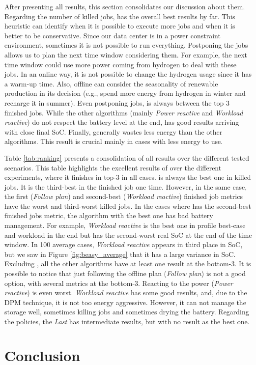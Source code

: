 After presenting all results, this section consolidates our discussion about them. Regarding the number of killed jobs, \emph{\systemName} has the overall best results by far. This heuristic can identify when it is possible to execute more jobs and when it is better to be conservative. Since our data center is in a power constraint environment, sometimes it is not possible to run everything. Postponing the jobs allows us to plan the next time window considering them. For example, the next time window could use more power coming from hydrogen to deal with these jobs. In an online way, it is not possible to change the hydrogen usage since it has a warm-up time. Also, offline can consider the seasonality of renewable production in its decision (e.g., spend more energy from hydrogen in winter and recharge it in summer). Even postponing jobs, \emph{\systemName} is always between the top 3 finished jobs. While the other algorithms (mainly \emph{Power reactive} and \emph{Workload reactive}) do not respect the battery level at the end, \emph{\systemName} has good results arriving with close final SoC. Finally, \emph{\systemName} generally wastes less energy than the other algorithms. This result is crucial mainly in cases with less energy to use.

Table \ref{tab:ranking} presents a consolidation of all results over the different tested scenarios. This table highlights the excellent results of \emph{\systemName} over the different experiments, where it finishes in top-3 in all cases. \emph{\systemName} is always the best one in killed jobs. It is the third-best in the finished job one time. However, in the same case, the first (\emph{Follow plan}) and second-best (\emph{Workload reactive}) finished job metrics have the worst and third-worst killed jobs. In the cases where \emph{\systemName} has the second-best finished jobs metric, the algorithm with the best one has bad battery management. For example, \emph{Workload reactive} is the best one in profile best-case and workload in the end but has the second-worst real SoC at the end of the time window. In 100 average cases, \emph{Workload reactive} appears in third place in SoC, but we saw in Figure \ref{fig:beasy_average} that it has a large variance in SoC. Excluding \emph{\systemName}, all the other algorithms have at least one result at the bottom-3. It is possible to notice that just following the offline plan (\emph{Follow plan}) is not a good option, with several metrics at the bottom-3. Reacting to the power (\emph{Power reactive}) is even worst. \emph{Workload reactive} has some good results, and, due to the DPM technique, it is not too energy aggressive. However, it can not manage the storage well, sometimes killing jobs and sometimes drying the battery. Regarding the policies, the \emph{Last} has intermediate results, but with no result as the best one.




\section{Conclusion}
